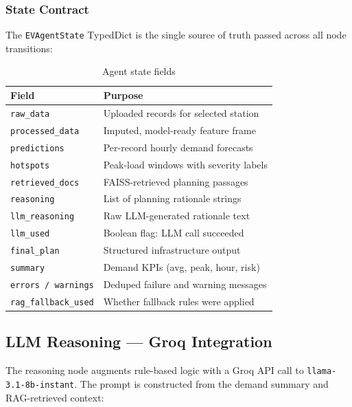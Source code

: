 \documentclass[12pt,a4paper]{article}
\begin{document}
\subsubsection{State Contract}

The \texttt{EVAgentState} TypedDict is the single source of truth passed across
all node transitions:

\begin{table}[H]
\centering
\caption{Agent state fields}
\begin{tabular}{ll}
  \toprule
  \textbf{Field} & \textbf{Purpose} \\
  \midrule
  \texttt{raw\_data}           & Uploaded records for selected station \\
  \texttt{processed\_data}     & Imputed, model-ready feature frame \\
  \texttt{predictions}         & Per-record hourly demand forecasts \\
  \texttt{hotspots}            & Peak-load windows with severity labels \\
  \texttt{retrieved\_docs}     & FAISS-retrieved planning passages \\
  \texttt{reasoning}           & List of planning rationale strings \\
  \texttt{llm\_reasoning}      & Raw LLM-generated rationale text \\
  \texttt{llm\_used}           & Boolean flag: LLM call succeeded \\
  \texttt{final\_plan}         & Structured infrastructure output \\
  \texttt{summary}             & Demand KPIs (avg, peak, hour, risk) \\
  \texttt{errors / warnings}   & Deduped failure and warning messages \\
  \texttt{rag\_fallback\_used} & Whether fallback rules were applied \\
  \bottomrule
\end{tabular}
\label{tab:state}
\end{table}

\subsection{LLM Reasoning — Groq Integration}
\label{subsec:llm}
The reasoning node augments rule-based logic with a Groq API call to
\texttt{llama-3.1-8b-instant}. The prompt is constructed from the demand summary
and RAG-retrieved context:
\end{document}
